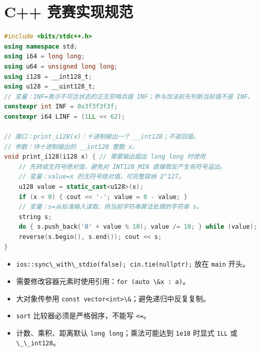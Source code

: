 \section{C++ 竞赛实现规范}\label{c-ux7adeux8d5bux5b9eux73b0ux89c4ux8303}

\begin{lstlisting}[language={C++}]
#include <bits/stdc++.h>
using namespace std;
using i64 = long long;
using u64 = unsigned long long;
using i128 = __int128_t;
using u128 = __uint128_t;
// 变量：INF=表示不可达状态的正无穷哨兵值 INF；参与加法前先判断当前值不是 INF。
constexpr int INF = 0x3f3f3f3f;
constexpr i64 LINF = (1LL << 62);

// 接口：print_i128(x)：十进制输出一个 __int128；不返回值。
// 参数：待十进制输出的 __int128 整数 x。
void print_i128(i128 x) { // 需要输出超出 long long 时使用
    // 先转成无符号绝对值，避免对 INT128_MIN 直接取反产生有符号溢出。
    // 变量：value=x 的无符号绝对值，可完整容纳 2^127。
    u128 value = static_cast<u128>(x);
    if (x < 0) { cout << '-'; value = 0 - value; }
    // 变量：s=从标准输入读取、供当前字符串算法处理的字符串 s。
    string s;
    do { s.push_back('0' + value % 10); value /= 10; } while (value);
    reverse(s.begin(), s.end()); cout << s;
}
\end{lstlisting}

\begin{itemize}
\tightlist
\item
  \passthrough{\lstinline!ios::sync\_with\_stdio(false); cin.tie(nullptr);!} 放在 \passthrough{\lstinline!main!} 开头。
\item
  需要修改容器元素时使用引用：\passthrough{\lstinline!for (auto \&x : a)!}。
\item
  大对象传参用 \passthrough{\lstinline!const vector<int>\&!}；避免递归中反复复制。
\item
  \passthrough{\lstinline!sort!} 比较器必须是严格弱序，不能写 \passthrough{\lstinline!<=!}。
\item
  计数、乘积、距离默认 \passthrough{\lstinline!long long!}；乘法可能达到 \passthrough{\lstinline!1e18!} 时显式 \passthrough{\lstinline!1LL!} 或 \passthrough{\lstinline!\_\_int128!}。
\end{itemize}
